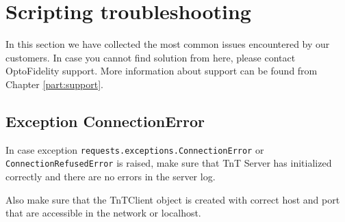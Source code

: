 \section{Scripting troubleshooting}

In this section we have collected the most common issues encountered by our customers. In case you cannot find solution from here, please contact OptoFidelity support. More information about support can be found from Chapter \ref{part:support}.

\subsection{Exception ConnectionError}

In case exception \texttt{requests.exceptions.ConnectionError} or \texttt{ConnectionRefusedError} is raised, make sure that TnT Server has initialized correctly and there are no errors in the server log.

Also make sure that the TnTClient object is created with correct host and port that are accessible in the network or localhost.
